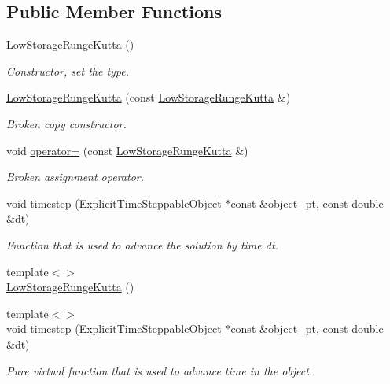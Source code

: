 \subsection*{Public Member Functions}
\begin{DoxyCompactItemize}
\item 
\hyperlink{classoomph_1_1LowStorageRungeKutta_a93db8747a10fc7361e8034083255428a}{Low\+Storage\+Runge\+Kutta} ()
\begin{DoxyCompactList}\small\item\em Constructor, set the type. \end{DoxyCompactList}\item 
\hyperlink{classoomph_1_1LowStorageRungeKutta_a5cc6f1c22d9d279ed095c755f04e0a04}{Low\+Storage\+Runge\+Kutta} (const \hyperlink{classoomph_1_1LowStorageRungeKutta}{Low\+Storage\+Runge\+Kutta} \&)
\begin{DoxyCompactList}\small\item\em Broken copy constructor. \end{DoxyCompactList}\item 
void \hyperlink{classoomph_1_1LowStorageRungeKutta_a4c684b9403d27e2f03cd272e584ff923}{operator=} (const \hyperlink{classoomph_1_1LowStorageRungeKutta}{Low\+Storage\+Runge\+Kutta} \&)
\begin{DoxyCompactList}\small\item\em Broken assignment operator. \end{DoxyCompactList}\item 
void \hyperlink{classoomph_1_1LowStorageRungeKutta_afc3d30c130b3a6ab111a89f0b0f884d6}{timestep} (\hyperlink{classoomph_1_1ExplicitTimeSteppableObject}{Explicit\+Time\+Steppable\+Object} $\ast$const \&object\+\_\+pt, const double \&dt)
\begin{DoxyCompactList}\small\item\em Function that is used to advance the solution by time dt. \end{DoxyCompactList}\item 
{\footnotesize template$<$$>$ }\\\hyperlink{classoomph_1_1LowStorageRungeKutta_a2013130cde2ea8819c3bc2ce7b6807ed}{Low\+Storage\+Runge\+Kutta} ()
\item 
{\footnotesize template$<$$>$ }\\void \hyperlink{classoomph_1_1LowStorageRungeKutta_ab2bcb2ad33cec657fd113debc8c4705b}{timestep} (\hyperlink{classoomph_1_1ExplicitTimeSteppableObject}{Explicit\+Time\+Steppable\+Object} $\ast$const \&object\+\_\+pt, const double \&dt)
\begin{DoxyCompactList}\small\item\em Pure virtual function that is used to advance time in the object. \end{DoxyCompactList}\end{DoxyCompactItemize}
